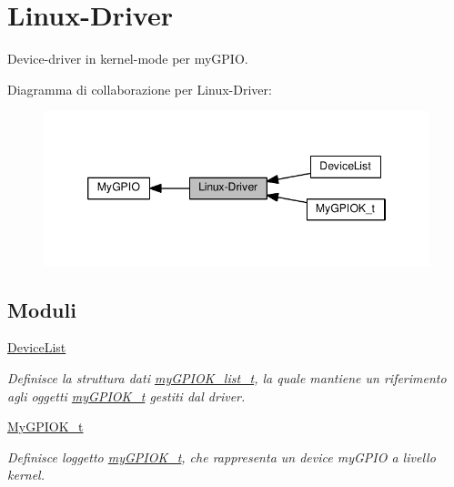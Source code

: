 \hypertarget{group___linux-_driver}{}\section{Linux-\/\+Driver}
\label{group___linux-_driver}


Device-\/driver in kernel-\/mode per my\+G\+P\+IO.  


Diagramma di collaborazione per Linux-\/\+Driver\+:\nopagebreak
\begin{figure}[H]
\begin{center}
\leavevmode
\includegraphics[width=346pt]{group___linux-_driver}
\end{center}
\end{figure}
\subsection*{Moduli}
\begin{DoxyCompactItemize}
\item 
\hyperlink{group___device_list}{Device\+List}
\begin{DoxyCompactList}\small\item\em Definisce la struttura dati \hyperlink{structmy_g_p_i_o_k__list__t}{my\+G\+P\+I\+O\+K\+\_\+list\+\_\+t}, la quale mantiene un riferimento agli oggetti \hyperlink{structmy_g_p_i_o_k__t}{my\+G\+P\+I\+O\+K\+\_\+t} gestiti dal driver. \end{DoxyCompactList}\item 
\hyperlink{group__my_g_p_i_o_k__t}{My\+G\+P\+I\+O\+K\+\_\+t}
\begin{DoxyCompactList}\small\item\em Definisce l\textquotesingle{}oggetto \hyperlink{structmy_g_p_i_o_k__t}{my\+G\+P\+I\+O\+K\+\_\+t}, che rappresenta un device my\+G\+P\+IO a livello kernel. \end{DoxyCompactList}\end{DoxyCompactItemize}
